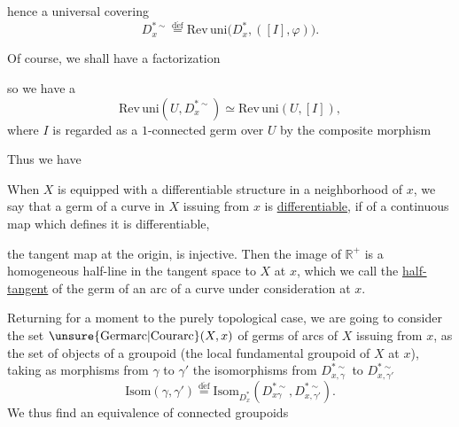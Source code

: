 
hence a universal covering
\[
\tag{70}
D_x^{*\sim}\overset{\mathrm{d\acute ef}}{=}
\mathrm{Rev\,uni}\bigl(D_x^*,([I],\varphi)\bigr).
\]

Of course, we shall have a factorization

so we have a 
\[
\tag{71}
\mathrm{Rev\,uni}(U,D_x^{*\sim})\simeq
\mathrm{Rev\,uni}(U,[I]),
\]
where $I$ is regarded as a $1$-connected germ over $U$ by the composite morphism

Thus we have

When $X$ is equipped with a differentiable structure in a neighborhood of $x$, we say that a germ of a curve in $X$ issuing from $x$ is \uline{differentiable}, if   of a continuous map
which defines it is differentiable, 


the tangent map at the origin, 
is injective. Then the image of $\mathbb R^+$ is a homogeneous half-line in the tangent space to $X$ at $x$, which we call the \uline{half-tangent} of the germ of an arc of a curve under consideration at $x$.

Returning for a moment to the purely topological case, we are going to consider the set $\unsure{\mathrm{Germarc}|\mathrm{Courarc}}(X,x)$ of germs of arcs of $X$ issuing from $x$, as the set of objects of a groupoid (the local fundamental groupoid of $X$ at $x$), taking as morphisms from $\gamma$ to $\gamma'$  the isomorphisms from  $D_{x,\gamma}^{*\sim}$ to $D_{x,\gamma'}^{*\sim}$
\[
\tag{74}
\mathrm{Isom}(\gamma,\gamma')\overset{\mathrm{d\acute ef}}{=}
\mathrm{Isom}_{D_x^*}(D_{x\gamma}^{*\sim},D_{x,\gamma'}^{*\sim}).
\]
We thus find  an equivalence of  connected groupoids
